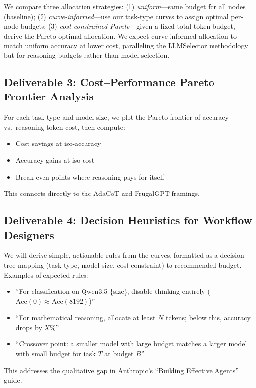 \documentclass[11pt]{article}
\begin{document}
We compare three allocation strategies: (1) \emph{uniform}---same budget for all nodes (baseline); (2) \emph{curve-informed}---use our task-type curves to assign optimal per-node budgets; (3) \emph{cost-constrained Pareto}---given a fixed total token budget, derive the Pareto-optimal allocation. We expect curve-informed allocation to match uniform accuracy at lower cost, paralleling the LLMSelector methodology \citep{chen2025llmselector} but for reasoning budgets rather than model selection.

\subsection{Deliverable 3: Cost--Performance Pareto Frontier Analysis}

For each task type and model size, we plot the Pareto frontier of accuracy vs.\ reasoning token cost, then compute:
\begin{itemize}[nosep]
    \item Cost savings at iso-accuracy
    \item Accuracy gains at iso-cost
    \item Break-even points where reasoning pays for itself
\end{itemize}
This connects directly to the AdaCoT \citep{lou2025adacot} and FrugalGPT \citep{chen2023frugalgpt} framings.

\subsection{Deliverable 4: Decision Heuristics for Workflow Designers}

We will derive simple, actionable rules from the curves, formatted as a decision tree mapping (task type, model size, cost constraint) to recommended budget. Examples of expected rules:
\begin{itemize}[nosep]
    \item ``For classification on Qwen3.5-\{size\}, disable thinking entirely ($\text{Acc}(0) \approx \text{Acc}(8192)$)''
    \item ``For mathematical reasoning, allocate at least $N$ tokens; below this, accuracy drops by $X\%$''
    \item ``Crossover point: a smaller model with large budget matches a larger model with small budget for task $T$ at budget $B$''
\end{itemize}
This addresses the qualitative gap in Anthropic's ``Building Effective Agents'' guide.
\end{document}
